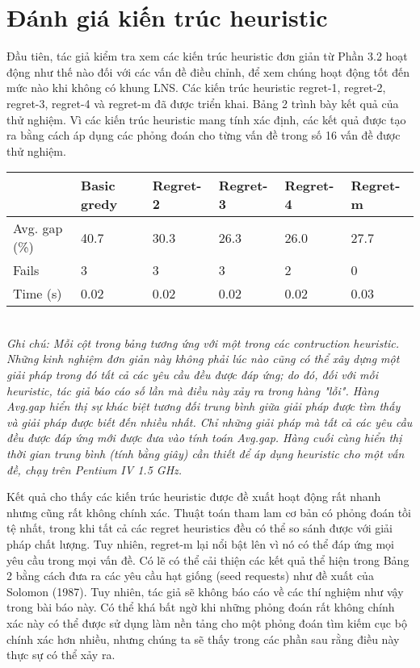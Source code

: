 \section{Đánh giá kiến trúc heuristic}
Đầu tiên, tác giả kiểm tra xem các kiến trúc heuristic đơn giản từ Phần 3.2 hoạt động như thế nào đối với các vấn đề điều chỉnh, để xem chúng hoạt động tốt đến mức nào khi không có khung LNS. Các kiến trúc heuristic regret-1, regret-2, regret-3, regret-4 và regret-m đã được triển khai. Bảng 2 trình bày kết quả của thử nghiệm. Vì các kiến trúc heuristic mang tính xác định, các kết quả được tạo ra bằng cách áp dụng các phỏng đoán cho từng vấn đề trong số 16 vấn đề được thử nghiệm.

\begin{table}[caption={Performance of Construction Heuristics}, label=tab:2]
    \begin{tabular}{@{}llllll@{}}
        \toprule
                      & Basic gredy & Regret-2 & Regret-3 & Regret-4 & Regret-m \\ \midrule
        Avg. gap (\%) & 40.7        & 30.3     & 26.3     & 26.0     & 27.7     \\
        Fails         & 3           & 3        & 3        & 2        & 0        \\
        Time (s)      & 0.02        & 0.02     & 0.02     & 0.02     & 0.03     \\ \bottomrule
        \end{tabular} \\
        \justify
        \textit{Ghi chú: Mỗi cột trong bảng tương ứng với một trong các contruction heuristic. Những kinh nghiệm đơn giản này không phải lúc nào cũng có thể xây dựng một giải pháp trong đó tất cả các yêu cầu đều được đáp ứng; do đó, đối với mỗi heuristic, tác giả báo cáo số lần mà điều này xảy ra trong hàng "lỗi". Hàng Avg.gap hiển thị sự khác biệt tương đối trung bình giữa giải pháp được tìm thấy và giải pháp được biết đến nhiều nhất. Chỉ những giải pháp mà tất cả các yêu cầu đều được đáp ứng mới được đưa vào tính toán Avg.gap. Hàng cuối cùng hiển thị thời gian trung bình (tính bằng giây) cần thiết để áp dụng heuristic cho một vấn đề, chạy trên Pentium IV 1.5 GHz.}
\end{table}

Kết quả cho thấy các kiến trúc heuristic được đề xuất hoạt động rất nhanh nhưng cũng rất không chính xác. Thuật toán tham lam cơ bản có phỏng đoán tồi tệ nhất, trong khi tất cả các regret heuristics đều có thể so sánh được với giải pháp chất lượng. Tuy nhiên, regret-m lại nổi bật lên vì nó có thể đáp ứng mọi yêu cầu trong mọi vấn đề. Có lẽ có thể cải thiện các kết quả thể hiện trong Bảng 2 bằng cách đưa ra các yêu cầu hạt giống (seed requests) như đề xuất của Solomon (1987). Tuy nhiên, tác giả sẽ không báo cáo về các thí nghiệm như vậy trong bài báo này. Có thể khá bất ngờ khi những phỏng đoán rất không chính xác này có thể được sử dụng làm nền tảng cho một phỏng đoán tìm kiếm cục bộ chính xác hơn nhiều, nhưng chúng ta sẽ thấy trong các phần sau rằng điều này thực sự có thể xảy ra.


